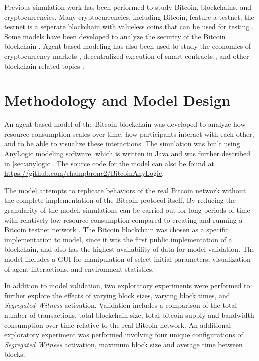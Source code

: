 \documentclass[12pt]{report}
\begin{document}
Previous simulation work has been performed to study Bitcoin, blockchains, and cryptocurrencies. Many cryptocurrencies, including Bitcoin, feature a testnet; the testnet is a seperate blockchain with valueless coins that can be used for testing \cite{bitcoinwiki.}. Some models have been developed to analyze the security of the Bitcoin blockchain \cite{Gervais.2016,Carlsten.2016}. Agent based modeling has also been used to study the economics of cryptocurrency markets \cite{Cocco.2017, NORGAARD., Bornholdt.2014}, decentralized execution of smart contracts \cite{Chen.2017}, and other blockchain related topics \cite{Terna., Laskowski.2017}. 


\section{Methodology and Model Design}
An agent-based model of the Bitcoin blockchain was developed to analyze how resource consumption scales over time, how participants interact with each other, and to be able to visualize these interactions. The simulation was built using AnyLogic modeling software, which is written in Java and was further described in \autoref{sec:anylogic}. The source code for the model can also be found at \url{https://github.com/champbronc2/BitcoinAnyLogic}.

The model attempts to replicate behaviors of the real Bitcoin network without the complete implementation of the Bitcoin protocol itself. By reducing the granularity of the model, simulations can be carried out for long periods of time with relatively low resource consumption compared to creating and running a Bitcoin testnet network \cite{bitcoinwiki.}. The Bitcoin blockchain was chosen as a specific implementation to model, since it was the first public implementation of a blockchain, and also has the highest availability of data for model validation. The model includes a GUI for manipulation of select initial parameters, visualization of agent interactions, and environment statistics.

In addition to model validation, two exploratory experiments were performed to further explore the effects of varying block sizes,  varying block times, and \textit{Segregated Witness} activation. Validation includes a comparison of the total number of transactions, total blockchain size, total bitcoin supply and bandwidth consumption over time relative to the real Bitcoin network. An additional exploratory experiment was performed involving four unique configurations of \textit{Segregated Witness} activation, maximum block size and average time between blocks.
\end{document}
